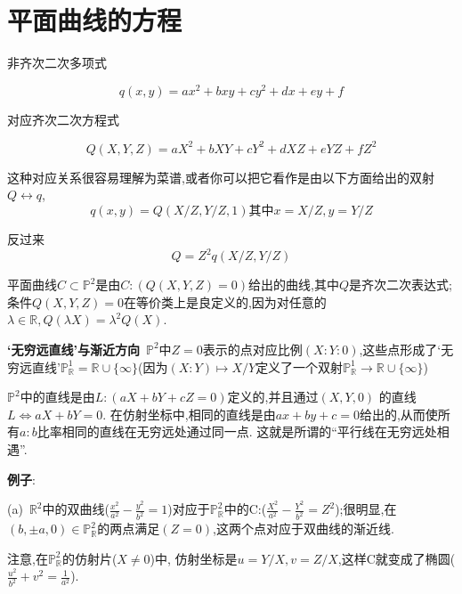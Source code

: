 \documentclass[UTF8]{book}
\begin{document}
	\section{平面曲线的方程}
		非齐次二次多项式
		
		\begin{equation*}
				q(x,y)=ax^{2}+bxy+cy^{2}+dx+ey+f
		\end{equation*}
	
		对应齐次二次方程式
		
		\begin{equation*}
			Q(X,Y,Z)=aX^{2}+bXY+cY^{2}+dXZ+eYZ+fZ^{2}
		\end{equation*}
		
		这种对应关系很容易理解为菜谱,或者你可以把它看作是由以下方面给出的双射$Q  \longleftrightarrow q$,
		\begin{equation*}
			q(x,y)=Q(X/Z,Y/Z,1) \text{其中} x=X/Z,y=Y/Z
		\end{equation*}
	
	
		反过来
		\begin{equation*}
			Q=Z^{2}q(X/Z,Y/Z)
		\end{equation*}
	
		平面曲线$C\subset \mathbb{P}^{2}$是由$ C:(Q(X,Y,Z)=0) $给出的曲线,其中$ Q $是齐次二次表达式;条件$ Q(X,Y,Z)=0 $在等价类上是良定义的,因为对任意的$\lambda \in \mathbb{R}, Q(\lambda X)=\lambda^{2}Q(X)$.
		
		
		\textbf{‘无穷远直线’与渐近方向}\ 
		$\mathbb{P}^{2}$中$ Z=0 $表示的点对应比例$ (X:Y:0) $,这些点形成了‘无穷远直线’$\mathbb{P}^{1}_{\mathbb{R}}=\mathbb{R} \cup \{ \infty \}$(因为$(X:Y)\mapsto X/Y$定义了一个双射$\mathbb{P}^{1}_{\mathbb{R}} \rightarrow \mathbb{R} \cup \{ \infty \}$)
		
		
		 $\mathbb{P}^{2}$中的直线是由$ L:(aX+bY+cZ=0) $定义的,并且通过$(X,Y,0)$ 的直线 $L\Longleftrightarrow aX+bY=0$. 在仿射坐标中,相同的直线是由$ ax+by+c=0 $给出的,从而使所有$a : b$比率相同的直线在无穷远处通过同一点. 这就是所谓的“平行线在无穷远处相遇”.
		
		
		\textbf{例子}:
		
		
		(a)\ $\mathbb{R}^{2}$中的双曲线($\frac{x^{2}}{a^{2}}-\frac{y^{2}}{b^{2}}=1$)对应于$\mathbb{P}^{2}_{\mathbb{R}}$中的C:($\frac{X^{2}}{a^{2}}-\frac{Y^{2}}{b^{2}}=Z^{2}$);很明显,在$(b,±a,0)\in \mathbb{P}^{2}_{\mathbb{R}}$的两点满足$ (Z=0) $,这两个点对应于双曲线的渐近线.
		
		
		注意,在$\mathbb{P}^{2}_{\mathbb{R}}$的仿射片($X\neq 0$)中, 仿射坐标是$ u=Y/X,v=Z/X $,这样C就变成了椭圆($\frac{u^{2}}{b^{2}}+v^{2}=\frac{1}{a^{2}}$).
		
\end{document}
